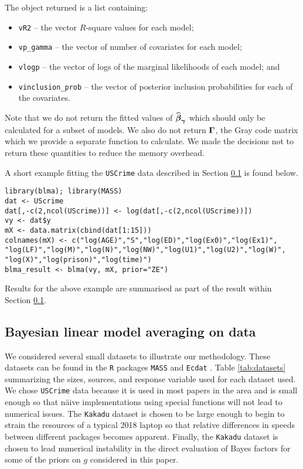 \noindent 
The object returned is a 
list containing:
\begin{itemize}
	\item 
	{\tt vR2} -- the vector $R$-square values for each model; 
	
	\item 
	{\tt vp\_gamma} -- the vector of number of covariates for each model;
	
	\item 
	{\tt vlogp} -- the vector of logs of the marginal likelihoods of each model; and
	
	\item 
	{\tt vinclusion\_prob} -- the vector of posterior inclusion probabilities for each of the covariates. 
\end{itemize}

\noindent 
Note that we do not return the fitted values of 
$\widehat{{\boldsymbol \beta}}_{{\boldsymbol \gamma}}$ which should only be calculated
for a subset of models. We also do not return ${\boldsymbol \Gamma}$, the Gray code matrix 
which we provide a separate function to calculate. We made the decisions
not to return these quantities to reduce the memory overhead.

A short example fitting the {\tt USCrime} data described in Section 
\ref{sec:BLMA} is found below.

\begin{verbatim}
library(blma); library(MASS)
dat <- UScrime
dat[,-c(2,ncol(UScrime))] <- log(dat[,-c(2,ncol(UScrime))])
vy <- dat$y
mX <- data.matrix(cbind(dat[1:15]))
colnames(mX) <- c("log(AGE)","S","log(ED)","log(Ex0)","log(Ex1)",
"log(LF)","log(M)","log(N)","log(NW)","log(U1)","log(U2)","log(W)",
"log(X)","log(prison)","log(time)") 
blma_result <- blma(vy, mX, prior="ZE")
\end{verbatim}

\noindent Results for the above example are summarised as part of the result within Section 
\ref{sec:BLMA}.

\subsection{Bayesian linear model averaging on data}\label{sec:BLMA}

We considered several small datasets to illustrate our methodology. These datasets
can be found in the {\tt R} packages {\tt MASS} \citep{Venables2002} and 
{\tt Ecdat} \citep{Croissant2016}. Table \ref{tab:datasets} summarizing the sizes,  
sources, and response variable used for each dataset used. 
We chose {\tt USCrime} data because it is used in most papers in
the area and is small enough so that n\"aive implementations using special functions will
not lead to numerical issues. The 
{\tt Kakadu} dataset is chosen to
be large enough to begin to strain the resources of a typical 2018 laptop so that
relative differences in speeds between different packages becomes apparent. Finally, the
{\tt Kakadu} dataset is chosen to lead numerical instability in the direct evaluation of Bayes
factors for some of the priors on $g$ considered in this paper.

